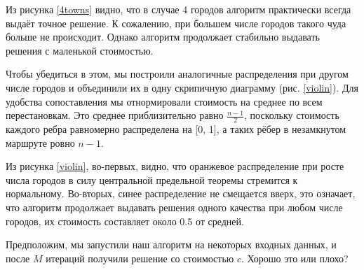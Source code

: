 
Из рисунка \ref{4towns} видно, что в случае 4 городов алгоритм практически всегда выдаёт точное решение. К сожалению, при большем числе городов такого чуда больше не происходит. Однако алгоритм продолжает стабильно выдавать решения с маленькой стоимостью.

Чтобы убедиться в этом, мы построили аналогичные распределения 
при другом числе городов и объединили их в одну скрипичную диаграмму (рис. \ref{violin}). Для удобства сопоставления мы отнормировали стоимость на среднее по всем перестановкам. Это среднее приблизительно равно $\frac{n-1}{2}$, поскольку стоимость каждого ребра равномерно распределена на [0, 1], а таких рёбер в незамкнутом маршруте ровно $n-1$.


Из рисунка \ref{violin}, во-первых, видно, что оранжевое распределение при росте числа городов в силу центральной предельной теоремы стремится к нормальному. Во-вторых, синее распределение не смещается вверх, это означает, что алгоритм продолжает выдавать решения одного качества при любом числе городов, их стоимость составляет около 0.5 от средней.




Предположим, мы запустили наш алгоритм на некоторых входных данных, и после $M$ итераций получили решение со стоимостью $c$. Хорошо это или плохо?

